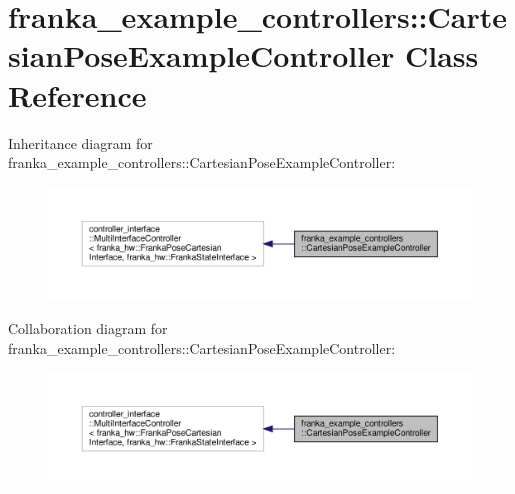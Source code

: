 \hypertarget{classfranka__example__controllers_1_1_cartesian_pose_example_controller}{}\section{franka\+\_\+example\+\_\+controllers\+:\+:Cartesian\+Pose\+Example\+Controller Class Reference}
\label{classfranka__example__controllers_1_1_cartesian_pose_example_controller}


Inheritance diagram for franka\+\_\+example\+\_\+controllers\+:\+:Cartesian\+Pose\+Example\+Controller\+:
\nopagebreak
\begin{figure}[H]
\begin{center}
\leavevmode
\includegraphics[width=350pt]{classfranka__example__controllers_1_1_cartesian_pose_example_controller__inherit__graph}
\end{center}
\end{figure}


Collaboration diagram for franka\+\_\+example\+\_\+controllers\+:\+:Cartesian\+Pose\+Example\+Controller\+:
\nopagebreak
\begin{figure}[H]
\begin{center}
\leavevmode
\includegraphics[width=350pt]{classfranka__example__controllers_1_1_cartesian_pose_example_controller__coll__graph}
\end{center}
\end{figure}
